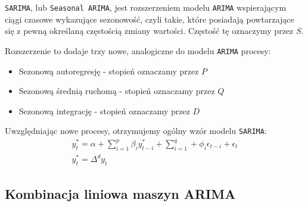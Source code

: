 \documentclass[12pt]{article}
\begin{document}
\texttt{SARIMA}, lub \texttt{Seasonal ARIMA}, jest rozszerzeniem modelu \texttt{ARIMA} wspierającym ciągi czasowe wykazujące sezonowość, czyli takie, które posiadają powtarzające się z pewną określaną częstością zmiany wartości. Częstość tę oznaczymy przez $S$.

Rozszerzenie to dodaje trzy nowe, analogiczne do modelu \texttt{ARIMA} procesy:
\begin{itemize}
    \item Sezonową autoregresję - stopień oznaczamy przez $P$
    \item Sezonową średnią ruchomą - stopień oznaczamy przez $Q$
    \item Sezonową integrację - stopień oznaczamy przez $D$
\end{itemize}
Uwzględniając nowe procesy, otrzymujemy ogólny wzór modelu \texttt{SARIMA}:
\begin{gather*}
    y_t^* = \alpha + \sum^p_{i=1}\beta_iy^*_{t-i} + \sum^q_{i=1} + \phi_i\epsilon_{t-i} + \epsilon_t \\
    y_t^* = \Delta^dy_t
\end{gather*}

\subsection{Kombinacja liniowa maszyn ARIMA}
\end{document}
